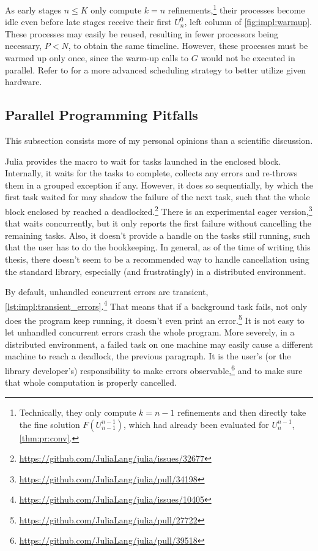 
As early stages $n \leq K$ only compute $k=n$ refinements,\footnote{%
  Technically, they only compute $k=n-1$ refinements and then directly take the fine solution $F(U_{n-1}^{n-1})$,
  which had already been evaluated for $U_n^{n-1}$,
  \cf \autoref{thm:pr:conv}.
}
their processes become idle even before late stages receive their first $U^0_n$,
\cf \eg left column of \autoref{fig:impl:warmup}.
These processes may easily be reused,
resulting in fewer processors being necessary, $P < N$,
to obtain the same timeline.
However, these processes must be warmed up only once,
since the warm-up calls to $G$ would not be executed in parallel.
Refer to \eg \cite{Nielsen2018} for a more advanced scheduling strategy to better utilize given hardware.

\subsection{Parallel Programming Pitfalls}

This subsection consists more of my personal opinions than a scientific discussion.

Julia provides the  macro to wait for tasks launched in the enclosed block.
Internally, it waits for the tasks to complete,
collects any errors and re-throws them in a grouped exception if any.
However, it does so sequentially,
by which the first task waited for may shadow the failure of the next task,
such that the whole block enclosed by  reached a deadlocked.\footnote{%
  \url{https://github.com/JuliaLang/julia/issues/32677}}
There is an experimental eager version,\footnote{%
  \url{https://github.com/JuliaLang/julia/pull/34198}}
that waits concurrently,
but it only reports the first failure without cancelling the remaining tasks.
Also, it doesn't provide a handle on the tasks still running,
such that the user has to do the bookkeeping.
In general, as of the time of writing this thesis,
there doesn't seem to be a recommended way to handle cancellation using the standard library,
especially (and frustratingly) in a distributed environment.

By default, unhandled concurrent errors are transient,
\cf \autoref{lst:impl:transient_errors}.\footnote{%
  \url{https://github.com/JuliaLang/julia/issues/10405}}
That means that if a background task fails,
not only does the program keep running,
it doesn't even print an error.\footnote{%
  \url{https://github.com/JuliaLang/julia/pull/27722}}
It is not easy to let unhandled concurrent errors crash the whole program.
More severely, in a distributed environment,
a failed task on one machine may easily cause a different machine to reach a deadlock,
\cf the previous paragraph.
It is the user's (or the library developer's) responsibility to make errors observable,\footnote{%
  \url{https://github.com/JuliaLang/julia/pull/39518}}
and to make sure that whole computation is properly cancelled.

